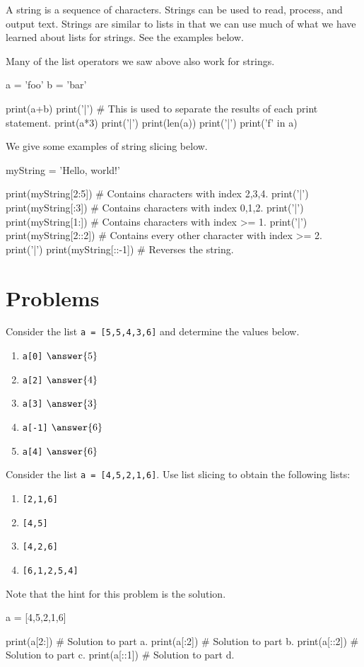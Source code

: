 \documentclass{ximera}
\begin{document}
A string is a sequence of characters. Strings can be used to read, process, and output text. Strings are similar to lists in that we can use much of what we have learned about lists for strings. See the examples below.

Many of the list operators we saw above also work for strings.

\begin{sageCell}
a = 'foo'
b = 'bar'

print(a+b)
print('|') # This is used to separate the results of each print statement.
print(a*3)
print('|')
print(len(a))
print('|')
print('f' in a)
\end{sageCell}

We give some examples of string slicing below.

\begin{sageCell}
myString = 'Hello, world!'

print(myString[2:5])  # Contains characters with index 2,3,4.
print('|')
print(myString[:3])   # Contains characters with index 0,1,2.
print('|')
print(myString[1:])   # Contains characters with index >= 1.
print('|')
print(myString[2::2]) # Contains every other character with index >= 2.
print('|')
print(myString[::-1]) # Reverses the string.
\end{sageCell}


\section{Problems}

\begin{question}
Consider the list \verb|a = [5,5,4,3,6]| and determine the values below.
	\begin{enumerate}
	\item \verb|a[0]| $\answer{5}$
	\item \verb|a[2]| $\answer{4}$
	\item \verb|a[3]| $\answer{3}$
	\item \verb|a[-1]| $\answer{6}$
	\item \verb|a[4]| $\answer{6}$
	\end{enumerate}
\end{question}

\begin{question}
	Consider the list \verb|a = [4,5,2,1,6]|. Use list slicing to obtain the following lists:
	\begin{enumerate}
	\item \verb|[2,1,6]|
	\item \verb|[4,5]|
	\item \verb|[4,2,6]|
	\item \verb|[6,1,2,5,4]|
	\end{enumerate}
	Note that the hint for this problem is the solution.
	\begin{hint}
\begin{sageCell}
a = [4,5,2,1,6]

print(a[2:])  # Solution to part a.
print(a[:2])  # Solution to part b.
print(a[::2]) # Solution to part c.
print(a[::1]) # Solution to part d.
\end{sageCell}
	\end{hint}
\end{question}
\end{document}
